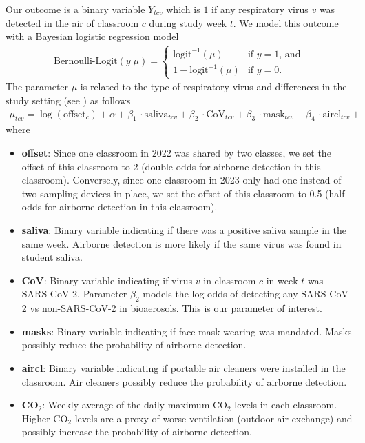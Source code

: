 \documentclass[fleqn,11pt]{wlscirep_supp}
\begin{document}
Our outcome is a binary variable $Y_{tcv}$ which is $1$ if any respiratory virus $v$ was detected in the air of classroom $c$ during study week $t$. We model this outcome with a Bayesian logistic regression model
\begin{align}
    \text{Bernoulli-Logit}(y|\mu) = \begin{cases}
        \text{logit}^{-1}(\mu) & \text{if }y=1\text{, and} \\
        1-\text{logit}^{-1}(\mu) & \text{if }y=0.
    \end{cases}
\end{align}
The parameter $\mu$ is related to the type of respiratory virus and differences in the study setting (see ) as follows
\begin{align}
    \mu_{tcv} = \log(\text{offset}_c) + \alpha + \beta_1\,\cdot\text{saliva}_{tcv} + \beta_2\,\cdot\text{CoV}_{tcv} + \beta_3\,\cdot\text{mask}_{tcv} + \beta_4\,\cdot\text{aircl}_{tcv} + 
\end{align}
where
\begin{itemize}
    \item \textbf{offset}: Since one classroom in 2022 was shared by two classes, we set the offset of this classroom to 2 (double odds for airborne detection in this classroom). Conversely, since one classroom in 2023 only had one instead of two sampling devices in place, we set the offset of this classroom to 0.5 (half odds for airborne detection in this classroom). 
    \item  \textbf{saliva}: Binary variable indicating if there was a positive saliva sample in the same week. Airborne detection is more likely if the same virus was found in student saliva.
    \item \textbf{CoV}: Binary variable indicating if virus $v$ in classroom $c$ in week $t$ was SARS-CoV-2. Parameter $\beta_2$ models the log odds of detecting any SARS-CoV-2 vs non-SARS-CoV-2 in bioaerosols. This is our parameter of interest.
    \item \textbf{masks}: Binary variable indicating if face mask wearing was mandated. Masks possibly reduce the probability of airborne detection.
    \item \textbf{aircl}: Binary variable indicating if portable air cleaners were installed in the classroom. Air cleaners possibly reduce the probability of airborne detection.
    \item \textbf{CO}$_2$: Weekly average of the daily maximum CO$_2$ levels in each classroom. Higher CO$_2$ levels are a proxy of worse ventilation (outdoor air exchange) and possibly increase the probability of airborne detection.
\end{itemize}
\end{document}
